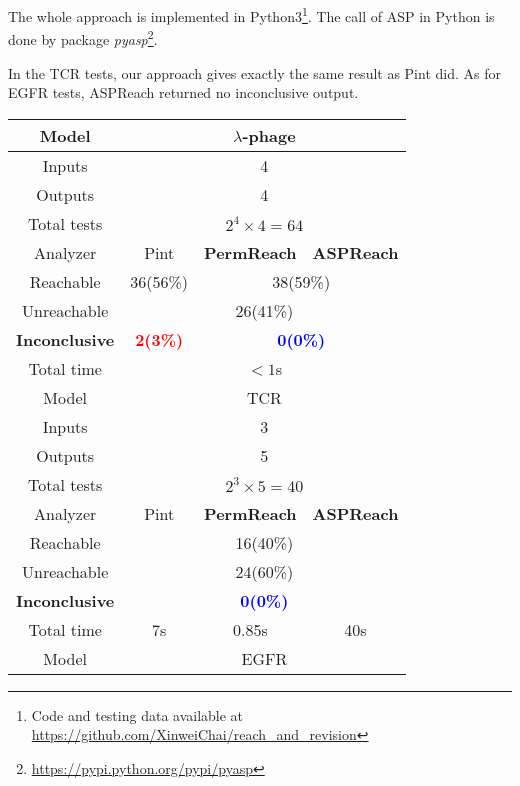 The whole approach is implemented in Python3\footnote{Code and testing data available at \url{https://github.com/XinweiChai/reach_and_revision}}.
The call of ASP in Python is done by package \textit{pyasp}\footnote{\url{https://pypi.python.org/pypi/pyasp}}. 

In the TCR tests, our approach gives exactly the same result as Pint did. 
As for EGFR tests, ASPReach returned no inconclusive output.

\begin{table}[ht]
    \begin{tabular}{|c|c|c|c|}
    \hline
     Model    &  \multicolumn{3}{c|}{$\lambda$-phage}\\
     \hline
     Inputs    & \multicolumn{3}{c|}{4}\\
     \hline
     Outputs&\multicolumn{3}{c|}{4}\\
     \hline
     Total tests&\multicolumn{3}{c|}{$2^4\times 4=64$}\\
     \hline
     Analyzer  &  Pint  &  \textbf{PermReach}   &\textbf{ASPReach}\\
     \hline
     Reachable & 36(56\%)& \multicolumn{2}{c|}{38(59\%)} \\
     \hline
     Unreachable&\multicolumn{3}{c|}{26(41\%)}\\
     \hline
     \textbf{Inconclusive} &\textcolor{red}{\textbf{2(3\%)}}&\multicolumn{2}{c|}{\textcolor{blue}{\textbf{0(0\%)}}}\\
     \hline
     Total time & \multicolumn{3}{c|}{$<1$s}\\
    \hline
     Model    &  \multicolumn{3}{c|}{TCR}\\
     \hline
     Inputs    & \multicolumn{3}{c|}{3}\\
     \hline
     Outputs&\multicolumn{3}{c|}{5}\\
     \hline
     Total tests&\multicolumn{3}{c|}{$2^3\times 5=40$}\\
     \hline
     Analyzer  &  Pint  &  \textbf{PermReach}   &\textbf{ASPReach}\\
     \hline
     Reachable & \multicolumn{3}{c|}{16(40\%)} \\
     \hline
     Unreachable&\multicolumn{3}{c|}{24(60\%)} \\
     \hline
     \textbf{Inconclusive} &\multicolumn{3}{c|}{\textcolor{blue}{\textbf{0(0\%)}}} \\
     \hline
     Total time &  7s     &0.85s  &  40s        \\
    \hline
     Model    &  \multicolumn{3}{c|}{EGFR}\\

\end{tabular}
\end{table}
